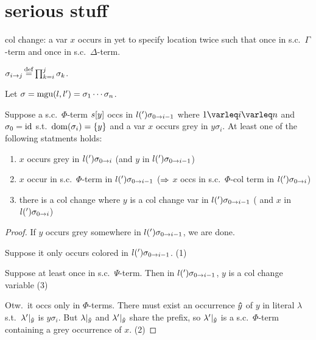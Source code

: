\documentclass[,%
	paper=a4,%
	DIV11, %
	twoside=false,%
	liststotoc,
	bibtotoc,
	draft=false,%
	numbers=noendperiod
]{scrartcl}
\begin{document}
\section{serious stuff}

\begin{defi}
	col change: a var $x$ occurs in yet to specify location twice such that once in s.c.\ $\Gamma$-term and once in s.c.\ $\Delta$-term.
\end{defi}

\newcommand{\epsilondelta}{\varepsilon\occ\delta}
\newcommand{\epsilonx}{\varepsilon\occ x}
\newcommand{\epsilony}{\varepsilon\occ y}
\newcommand{\epsilonz}{\varepsilon\occ z}


\begin{defi}
	$\sigma_{i\rightarrow j} \operatorname{\stackrel{\mathrm{def}}{=}} \prod_{k=i}^j\sigma_k$.
\end{defi}

\begin{lemma}
	\label{new_25}
	Let $\sigma = \operatorname{mgu}(l, l') = \sigma_1 \cdots \sigma_n$.

	Suppose a s.c.\ $\Phi$-term $s[y]$ occs in $l(')\sigma_{0 \rightarrow i-1}$ where $1\varleq i \varleq n$ and $\sigma_0 = \operatorname{id}$ s.t.\ $\operatorname{dom}(\sigma_i) = \{y\}$ and a var $x$ occurs grey in $y\sigma_i$.
	At least one of the following statments holds:

	\begin{enumerate}
		\item $x$ occurs grey in $l(')\sigma_{0 \rightarrow i}$ (and $y$ in $l(')\sigma_{0 \rightarrow i-1}$)
		\item $x$ occur in s.c.\ $\Phi$-term in $l(')\sigma_{0 \rightarrow i-1}$  
			($\Rightarrow$ $x$ occs in s.c.\ $\Phi$-col term in $l(')\sigma_{0 \rightarrow i}$)
		\item there is a col change where $y$ is a col change var in $l(')\sigma_{0 \rightarrow i-1}$ ( and $x$ in $l(')\sigma_{0 \rightarrow i}$) 
	\end{enumerate}
\end{lemma}
\begin{proof}
	If $y$ occurs grey somewhere in $l(')\sigma_{0 \rightarrow i-1}$, we are done.

	Suppose it only occurs colored in $l(')\sigma_{0 \rightarrow i-1}$. (1)

	Suppose at least once in s.c.\ $\Psi$-term.
	Then in $l(')\sigma_{0 \rightarrow i-1}$, $y$ is a col change variable (3)

	Otw.\ it occs only in $\Phi$-terms. 
	There must exist an occurrence $\bm\hat y$ of $y$ in literal $\lambda$ s.t.\ $\lambda'|_{\bm\hat y}$ is $y\sigma_i$.
But $\lambda|_{\bm\hat y}$ and $\lambda'|_{\bm\hat y}$ share the prefix, so $\lambda'|_{\bm\hat y}$ is a s.c.\ $\Phi$-term containing a grey occurrence of $x$. (2)
\end{proof}
\end{document}
